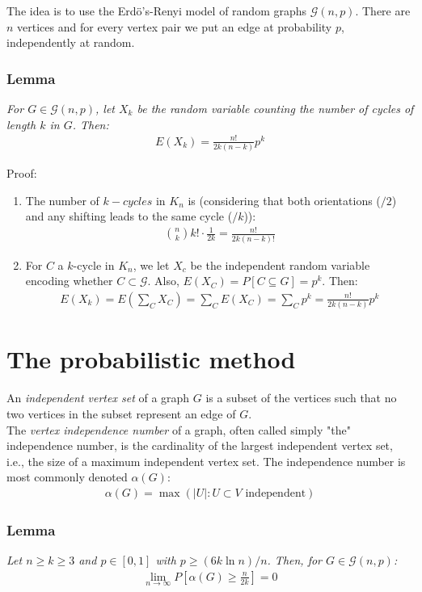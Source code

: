 The idea is to use the Erdö's-Renyi model of random graphs $\mathcal{G}(n,p)$. There are $n$ vertices and for every vertex pair we put an edge at probability $p$, independently at random.

\subsubsection{Lemma}
\textit{For $G \in \mathcal{G}(n,p)$, let $X_k$ be the random variable counting the number of cycles of length $k$ in $G$. Then:}
\begin{eqnarray}
	E(X_k) = \frac{n!}{2k(n-k)} p^k
\end{eqnarray}

Proof:
\begin{enumerate}
	\item The number of $k-cycles$ in $K_n$ is (considering that both orientations ($/2$) and any shifting leads to the same cycle ($/k$)):
	\begin{eqnarray}
		{{n}\choose{k}} k! \cdot \frac{1}{2k} = \frac{n!}{2k(n-k)!}
	\end{eqnarray}
	\item For $C$ a $k$-cycle in $K_n$, we let $X_c$ be the independent random variable encoding whether $C \subset \mathcal{G}$. Also, $E(X_C) = P[C \subseteq G] = p^k$. Then:
	\begin{eqnarray}
		E(X_k) = E(\sum_C X_C) = \sum_C E(X_C) = \sum_C p^k = \frac{n!}{2k(n-k)} p^k
	\end{eqnarray}
\end{enumerate}


\section{The probabilistic method}

An \textit{independent vertex set} of a graph $G$ is a subset of the vertices such that no two vertices in the subset represent an edge of $G$. \\

The \textit{vertex independence number} of a graph, often called simply "the" independence number, is the cardinality of the largest independent vertex set, i.e., the size of a maximum independent vertex set. The independence number is most commonly denoted $\alpha(G)$:
\begin{eqnarray}
	\alpha(G) = \max(|U| : U \subset V \text{ independent})
\end{eqnarray}

\subsubsection{Lemma}
\textit{Let $n \geq k \geq 3$ and $p \in [0,1]$ with $p \geq (6k \ln n)/n$. Then, for $G \in \mathcal{G}(n,p)$:}
\begin{eqnarray}
	\lim_{n \rightarrow \infty} P[\alpha(G) \geq \frac{n}{2k}] = 0
\end{eqnarray}

